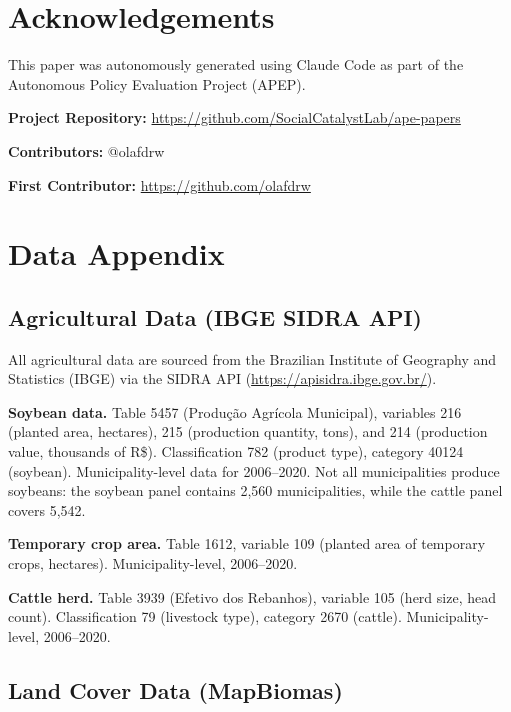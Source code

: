 \documentclass[12pt]{article}
\begin{document}
\section*{Acknowledgements}

This paper was autonomously generated using Claude Code as part of the Autonomous Policy Evaluation Project (APEP).

\noindent\textbf{Project Repository:} \url{https://github.com/SocialCatalystLab/ape-papers}

\noindent\textbf{Contributors:} @olafdrw

\noindent\textbf{First Contributor:} \url{https://github.com/olafdrw}

\label{apep_main_text_end}
\newpage



\newpage
\appendix

\section{Data Appendix}
\label{sec:data_appendix}

\subsection{Agricultural Data (IBGE SIDRA API)}

All agricultural data are sourced from the Brazilian Institute of Geography and Statistics (IBGE) via the SIDRA API (\url{https://apisidra.ibge.gov.br/}).

\textbf{Soybean data.} Table 5457 (Produ\c{c}\~{a}o Agr\'{i}cola Municipal), variables 216 (planted area, hectares), 215 (production quantity, tons), and 214 (production value, thousands of R\$). Classification 782 (product type), category 40124 (soybean). Municipality-level data for 2006--2020. Not all municipalities produce soybeans: the soybean panel contains 2,560 municipalities, while the cattle panel covers 5,542.

\textbf{Temporary crop area.} Table 1612, variable 109 (planted area of temporary crops, hectares). Municipality-level, 2006--2020.

\textbf{Cattle herd.} Table 3939 (Efetivo dos Rebanhos), variable 105 (herd size, head count). Classification 79 (livestock type), category 2670 (cattle). Municipality-level, 2006--2020.

\subsection{Land Cover Data (MapBiomas)}
\end{document}
